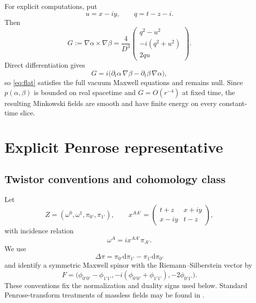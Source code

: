 \documentclass[11pt,a4paper]{article}
\numberwithin{equation}{section}
\theoremstyle{remark}
\newcommand{\dd}{\mathrm{d}}
\begin{document}
For explicit computations, put
\begin{equation}
 u=x-iy,
 \qquad
 q=t-z-i.
\end{equation}
Then
\begin{equation}\label{eq:seed}
 G:=\nabla\alpha\times\nabla\beta
 =\frac{4}{D^3}
 \begin{pmatrix}
 q^2-u^2\\
 -i(q^2+u^2)\\
 2qu
 \end{pmatrix}.
\end{equation}
Direct differentiation gives
\begin{equation}\label{eq:batemanidentity}
 G=i\bigl(\partial_t\alpha\,\nabla\beta
 -\partial_t\beta\,\nabla\alpha\bigr),
\end{equation}
so \eqref{eq:flat} satisfies the full vacuum Maxwell equations and remains null. Since \(p(\alpha,\beta)\) is bounded on real spacetime and \(G=O(r^{-4})\) at fixed time, the resulting Minkowski fields are smooth and have finite energy on every constant-time slice.

\section{Explicit Penrose representative}

\subsection{Twistor conventions and cohomology class}

Let
\begin{equation}
 Z=(\omega^0,\omega^1,\pi_{0'},\pi_{1'}),
 \qquad
 x^{AA'}=
 \begin{pmatrix}
 t+z&x+iy\\
 x-iy&t-z
 \end{pmatrix},
\end{equation}
with incidence relation
\begin{equation}
 \omega^A=ix^{AA'}\pi_{A'}.
\end{equation}
We use
\begin{equation}
 \Delta\pi
 =\pi_{0'}\dd\pi_{1'}-\pi_{1'}\dd\pi_{0'}
\end{equation}
and identify a symmetric Maxwell spinor with the Riemann--Silberstein vector by
\begin{equation}\label{eq:spinmap}
 F=
 \bigl(
 \phi_{0'0'}-\phi_{1'1'},
 -i(\phi_{0'0'}+\phi_{1'1'}),
 -2\phi_{0'1'}
 \bigr).
\end{equation}
These conventions fix the normalization and duality signs used below. Standard Penrose-transform treatments of massless fields may be found in \cite{PenroseRindler,Thompson2015}.
\end{document}
